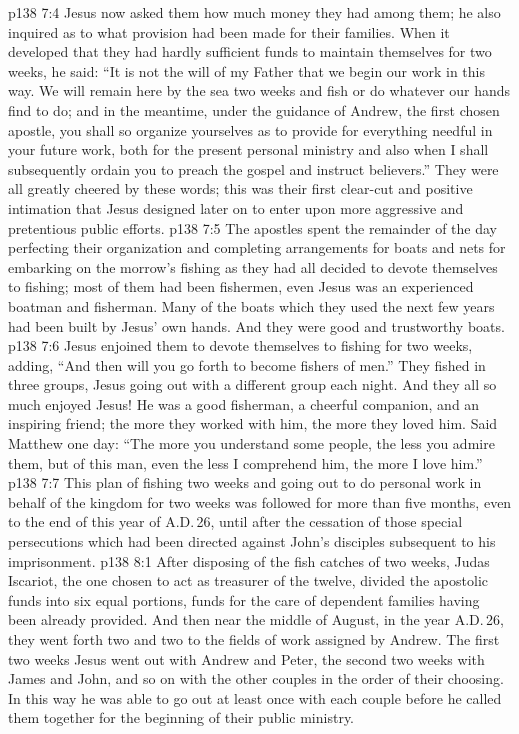 \vs p138 7:4 Jesus now asked them how much money they had among them; he also inquired as to what provision had been made for their families. When it developed that they had hardly sufficient funds to maintain themselves for two weeks, he said: \textcolor{ubdarkred}{“It is not the will of my Father that we begin our work in this way. We will remain here by the sea two weeks and fish or do whatever our hands find to do; and in the meantime, under the guidance of Andrew, the first chosen apostle, you shall so organize yourselves as to provide for everything needful in your future work, both for the present personal ministry and also when I shall subsequently ordain you to preach the gospel and instruct believers.”} They were all greatly cheered by these words; this was their first clear\hyp{}cut and positive intimation that Jesus designed later on to enter upon more aggressive and pretentious public efforts.
\vs p138 7:5 The apostles spent the remainder of the day perfecting their organization and completing arrangements for boats and nets for embarking on the morrow’s fishing as they had all decided to devote themselves to fishing; most of them had been fishermen, even Jesus was an experienced boatman and fisherman. Many of the boats which they used the next few years had been built by Jesus’ own hands. And they were good and trustworthy boats.
\vs p138 7:6 Jesus enjoined them to devote themselves to fishing for two weeks, adding, \textcolor{ubdarkred}{“And then will you go forth to become fishers of men.”} They fished in three groups, Jesus going out with a different group each night. And they all so much enjoyed Jesus! He was a good fisherman, a cheerful companion, and an inspiring friend; the more they worked with him, the more they loved him. Said Matthew one day: “The more you understand some people, the less you admire them, but of this man, even the less I comprehend him, the more I love him.”
\vs p138 7:7 This plan of fishing two weeks and going out to do personal work in behalf of the kingdom for two weeks was followed for more than five months, even to the end of this year of A.D.\,26, until after the cessation of those special persecutions which had been directed against John’s disciples subsequent to his imprisonment.
\vs p138 8:1 After disposing of the fish catches of two weeks, Judas Iscariot, the one chosen to act as treasurer of the twelve, divided the apostolic funds into six equal portions, funds for the care of dependent families having been already provided. And then near the middle of August, in the year A.D.\,26, they went forth two and two to the fields of work assigned by Andrew. The first two weeks Jesus went out with Andrew and Peter, the second two weeks with James and John, and so on with the other couples in the order of their choosing. In this way he was able to go out at least once with each couple before he called them together for the beginning of their public ministry.
